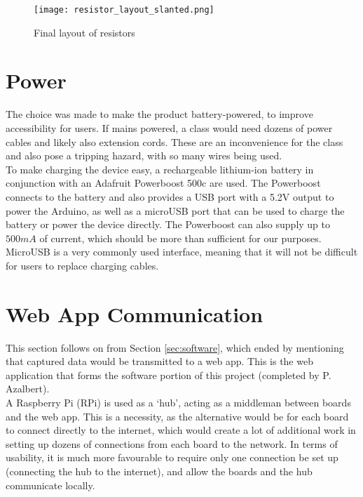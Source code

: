 \begin{figure}[H]
	\begin{center}
	\texttt{[image: resistor\_layout\_slanted.png]}\\ 
  	\caption{Final layout of resistors}
    \label{fig:resistor_layout_slanted}
    \end{center}
\end{figure}


\section{Power}
\label{sec:power}
The choice was made to make the product battery-powered, to improve accessibility for users. If mains powered, a class would need dozens of power cables and likely also extension cords. These are an inconvenience for the class and also pose a tripping hazard, with so many wires being used.\\

To make charging the device easy, a rechargeable lithium-ion battery in conjunction with an Adafruit Powerboost 500c \cite{PowerBoo78:online} are used. The Powerboost connects to the battery and also provides a USB port with a 5.2V output to power the Arduino, as well as a microUSB port that can be used to charge the battery or power the device directly. The Powerboost can also supply up to $500mA$ of current, which should be more than sufficient for our purposes. MicroUSB  is a very commonly used interface, meaning that it will not be difficult for users to replace charging cables. 


    

\section{Web App Communication}
\label{sec:hub_comms}

This section follows on from Section \ref{sec:software}, which ended by mentioning that captured data would be transmitted to a web app. This is the web application that forms the software portion of this project (completed by P. Azalbert). \\

A Raspberry Pi (RPi) is used as a `hub', acting as a middleman between boards and the web app. This is a necessity, as the alternative would be for each board to connect directly to the internet, which would create a lot of additional work in setting up dozens of connections from each board to the network. In terms of usability, it is much more favourable to require only one connection be set up (connecting the hub to the internet), and allow the boards and the hub communicate locally.\\

